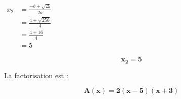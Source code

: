 \documentclass[a4paper,12pt]{article}
\begin{document}
\begin{enumerate}
$
\begin{aligned}
        x_2 &= \frac{-b + \sqrt{\Delta}}{2a}\\
        &= \frac{4 + \sqrt{256}}{4}\\
        &= \frac{4 + 16}{4}\\
        &= 5
\end{aligned}
$

\begin{resultbox}
    \[
    \mathbf{x_2 = 5}
    \]
\end{resultbox}

    La factorisation est :

\begin{resultbox}
    \[
    \mathbf{A(x) = 2(x - 5)(x + 3)}
    \]
\end{resultbox}
    
\end{enumerate}
\end{document}
